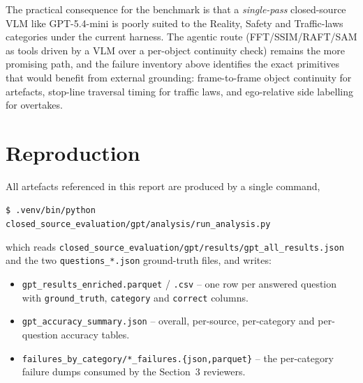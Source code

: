 \documentclass[11pt,a4paper]{article}
\newcommand{\code}[1]{\texttt{#1}}
\begin{document}
\noindent The practical consequence for the benchmark is that a
\emph{single-pass} closed-source VLM like GPT-5.4-mini is poorly
suited to the Reality, Safety and Traffic-laws categories under the
current harness. The agentic route (FFT/SSIM/RAFT/SAM as tools driven
by a VLM over a per-object continuity check) remains the more
promising path, and the failure inventory above identifies the exact
primitives that would benefit from external grounding: frame-to-frame
object continuity for artefacts, stop-line traversal timing for
traffic laws, and ego-relative side labelling for overtakes.

\appendix
\section{Reproduction}
All artefacts referenced in this report are produced by a single
command,
\begin{center}
\code{\$ .venv/bin/python closed\_source\_evaluation/gpt/analysis/run\_analysis.py}
\end{center}
which reads \code{closed\_source\_evaluation/gpt/results/gpt\_all\_results.json}
and the two \code{questions\_*.json} ground-truth files, and writes:
\begin{itemize}
  \item \code{gpt\_results\_enriched.parquet} / \code{.csv} -- one row per
  answered question with \code{ground\_truth}, \code{category} and
  \code{correct} columns.
  \item \code{gpt\_accuracy\_summary.json} -- overall, per-source,
  per-category and per-question accuracy tables.
  \item \code{failures\_by\_category/*\_failures.\{json,parquet\}} --
  the per-category failure dumps consumed by the Section~3 reviewers.
\end{itemize}
\end{document}
